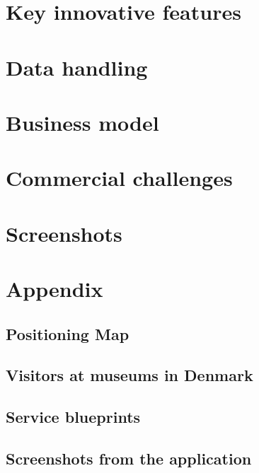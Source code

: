 \documentclass[a4paper,11pt,fleqn,dvipsnames,oneside,openright]{memoir}
\begin{document}
\chapter{Key innovative features}

\chapter{Data handling}


\chapter{Business model}


\chapter{Commercial challenges}


\chapter{Screenshots}

\begingroup
	\raggedright
	\printbibliography
\endgroup 

\appendix

\chapter{Appendix}

\section{Positioning Map}
\label{PositioningMap}

\newpage

\section{Visitors at museums in Denmark}
\label{Visitors}

\newpage

\section{Service blueprints}
\label{ServiceBlueprint}


\section{Screenshots from the application}
\label{AppScreenshots}

\newpage
\end{document}

